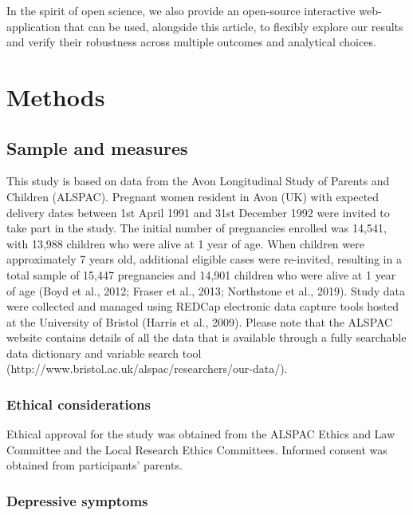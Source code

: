 \documentclass[
  letterpaper,
  DIV=11,
  numbers=noendperiod]{scrreport}
\begin{document}
In the spirit of open science, we also provide an open-source
interactive web-application that can be used, alongside this article, to
flexibly explore our results and verify their robustness across multiple
outcomes and analytical choices.

\section{Methods}\label{methods-4}

\subsection{Sample and measures}\label{sample-and-measures}

This study is based on data from the Avon Longitudinal Study of Parents
and Children (ALSPAC). Pregnant women resident in Avon (UK) with
expected delivery dates between 1st April 1991 and 31st December 1992
were invited to take part in the study. The initial number of
pregnancies enrolled was 14,541, with 13,988 children who were alive at
1 year of age. When children were approximately 7 years old, additional
eligible cases were re-invited, resulting in a total sample of 15,447
pregnancies and 14,901 children who were alive at 1 year of age (Boyd et
al., 2012; Fraser et al., 2013; Northstone et al., 2019). Study data
were collected and managed using REDCap electronic data capture tools
hosted at the University of Bristol (Harris et al., 2009). Please note
that the ALSPAC website contains details of all the data that is
available through a fully searchable data dictionary and variable search
tool (http://www.bristol.ac.uk/alspac/researchers/our-data/).

\subsubsection{Ethical considerations}\label{ethical-considerations}

Ethical approval for the study was obtained from the ALSPAC Ethics and
Law Committee and the Local Research Ethics Committees. Informed consent
was obtained from participants' parents.

\subsubsection{Depressive symptoms}\label{depressive-symptoms}
\end{document}
